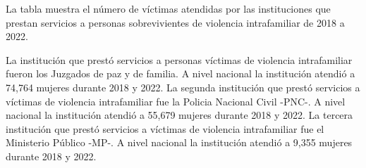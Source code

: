 \justifying La tabla muestra el número de víctimas atendidas por las instituciones que prestan servicios a personas sobrevivientes de violencia intrafamiliar de 2018 a 2022. 

La institución que prestó servicios a personas víctimas de violencia intrafamiliar fueron los Juzgados de paz y de familia. A nivel nacional la institución atendió a 74,764 mujeres durante 2018 y 2022. La segunda institución que prestó servicios a víctimas de violencia intrafamiliar fue la Policia Nacional Civil -PNC-. A nivel nacional la institución atendió a 55,679 mujeres durante 2018 y 2022. La tercera institución que prestó servicios a víctimas de violencia intrafamiliar fue el Ministerio Público -MP-. A nivel nacional la institución atendió a 9,355 mujeres durante 2018 y 2022.